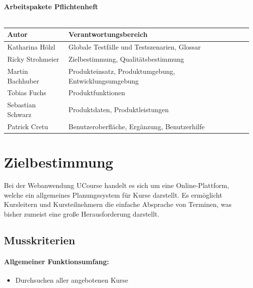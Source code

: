 \documentclass[a4paper]{scrreprt}
\begin{document}
\begin{titlepage}
\begin{center}
        \ \\
        \ \\
        \hspace{3 cm}\\
          \textbf{Arbeitspakete Pflichtenheft} \\
          \ \\
        
        \begin{tabular}{ | l | l |}
        	\hline
        	\textbf{Autor} & \textbf{Verantwortungsbereich} \\ \hline
        	 Katharina Hölzl & Globale Testfälle und Testszenarien, Glossar  \\ \hline
        	 Ricky Strohmeier& Zielbestimmung, Qualitätsbestimmung  \\ \hline
        	 Martin Bachhuber & Produkteinsatz, Produktumgebung, Entwicklungsumgebung  \\ \hline
	         Tobias Fuchs & Produktfunktionen \\ \hline
        	 Sebastian Schwarz & Produktdaten, Produktleistungen \\ \hline  
	         Patrick Cretu  &  Benutzeroberfläche, Ergänzung, Benutzerhilfe  \\ \hline
        \end{tabular}
    \end{center}
\end{titlepage}
 
 


\tableofcontents
 
\chapter{Zielbestimmung}
	   Bei der Webanwendung UCourse handelt es sich um eine Online-Plattform, welche ein allgemeines Planungssystem für Kurse darstellt. Es ermöglicht Kursleitern und Kursteilnehmern die einfache Absprache von Terminen, was bisher zumeist eine große Herausforderung darstellt.
    \section{Musskriterien}      
    	\subsubsection{Allgemeiner Funktionsumfang:}
      		\begin{itemize}
	      		\item Durchsuchen aller angebotenen Kurse
      		\end{itemize}
\end{document}

